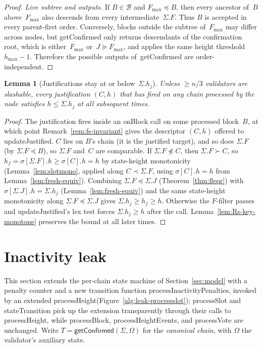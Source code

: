 \ifx\litemode\undefined\documentclass{article}\fi
\newcommand{\hmax}{\ensuremath{h_{\max}}\xspace}
\newcommand{\stateTransition}{\textsf{stateTransition}\xspace}
\newcommand{\processSlot}{\textsf{processSlot}\xspace}
\newcommand{\processBlock}{\textsf{processBlock}\xspace}
\newcommand{\processHeight}{\textsf{processHeight}\xspace}
\newcommand{\processHeightEvents}{\textsf{processHeightEvents}\xspace}
\newcommand{\processVote}{\textsf{processVote}\xspace}
\newcommand{\processInactivityPenalties}{\textsf{processInactivityPenalties}\xspace}
\newcommand{\onBlock}{\textsf{onBlock}\xspace}
\newcommand{\updateJustified}{\textsf{updateJustified}\xspace}
\newcommand{\getConfirmed}{\textsf{getConfirmed}\xspace}
\theoremstyle{plain}
\newtheorem{lemma}{Lemma}
\theoremstyle{definition}
\theoremstyle{remark}
\begin{document}
\begin{proof}
\emph{Live subtree and outputs.} If $B \in \mathcal B$ and $F_{\max} \preceq B$, then every ancestor of~$B$ above~$F_{\max}$ also descends from every intermediate~$\Sigma.F$.
Thus $B$ is accepted in every parent-first order.
Conversely, blocks outside the subtree of~$F_{\max}$ may differ across nodes, but \getConfirmed only returns descendants of the confirmation root, which is either~$F_{\max}$ or~$J \succeq F_{\max}$, and applies the same height threshold~$\hmax-1$.
Therefore the possible outputs of~\getConfirmed are order-independent.
\end{proof}

\begin{lemma}[Justifications stay at or below~$\Sigma.h_j$]\label{lem:no-high-just}
Unless $\geq n/3$ validators are slashable, every justification $(C, h)$ that has fired on any chain processed by the node satisfies $h \leq \Sigma.h_j$ at all subsequent times.
\end{lemma}

\begin{proof}
The justification fires inside an \onBlock call on some processed block~$B$, at which point Remark~\ref{rem:fs-invariant} gives the descriptor $(C, h)$ offered to \updateJustified.
$C$ lies on $B$'s chain (it is the justified target), and so does $\Sigma.F$ (by $\Sigma.F \preceq B$), so $\Sigma.F$ and~$C$ are comparable.
If $\Sigma.F \not\preceq C$, then $\Sigma.F \succ C$, so $h_f = \sigma[\Sigma.F].h \geq \sigma[C].h = h$ by state-height monotonicity (Lemma~\ref{lem:slotmono}, applied along $C \prec \Sigma.F$, using $\sigma[C].h = h$ from Lemma~\ref{lem:fresh-equiv}).
Combining $\Sigma.F \preceq \Sigma.J$ (Theorem~\ref{thm:fleqr}) with $\sigma[\Sigma.J].h = \Sigma.h_j$ (Lemma~\ref{lem:fresh-equiv}) and the same state-height monotonicity along $\Sigma.F \preceq \Sigma.J$ gives $\Sigma.h_j \geq h_f \geq h$.
Otherwise the $F$-filter passes and \updateJustified's lex test forces $\Sigma.h_j \geq h$ after the call.
Lemma~\ref{lem:Rs-key-monotone} preserves the bound at all later times.
\end{proof}

\section{Inactivity leak}\label{sec:leak}

This section extends the per-chain state machine of Section~\ref{sec:model} with a penalty counter and a new transition function \processInactivityPenalties, invoked by an extended \processHeight (Figure~\ref{alg:leak-processslot}); \processSlot and \stateTransition pick up the extension transparently through their calls to \processHeight, while \processBlock, \processHeightEvents, and \processVote are unchanged.
Write $T = \getConfirmed(\Sigma, \Omega)$ for the \emph{canonical chain}, with $\Omega$ the validator's auxiliary state.
\end{document}
